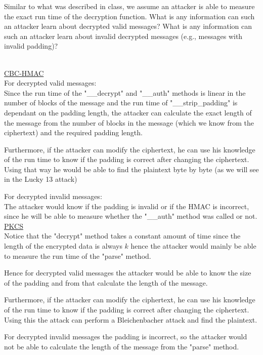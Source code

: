 \documentclass{article}
\title{
    \textmd{\bd{\hmwkClass:\ \\ \hmwkTitle}}\\
}
\author{\hmwkAuthorName}
\begin{document}
\maketitle

 \\
Similar to what was described in class, we assume an attacker is able to
measure the exact run time of the decryption function.
What is any information can  such an attacker learn about decrypted valid messages?
What is any information can such an attacker learn about invalid decrypted messages (e.g.,
messages with invalid padding)? \\ \\


\underline{CBC-HMAC} \\
For decrypted valid messages: \\
Since the run time of the "\_\_decrypt" and "\_\_auth" methods is linear
in the number of blocks of the message and the run time of "\_\_strip\_padding"
is dependant on the padding length, the attacker can calculate the exact length
of the message from the number of blocks in the message (which we know from the ciphertext)
and the required padding length.

Furthermore, if the attacker can modify the ciphertext, he can use his knowledge of the run time
to know if the padding is correct after changing the ciphertext. Using that way he would be able to find
the plaintext byte by byte (as we will see in the Lucky 13 attack)

For decrypted invalid messages: \\
The attacker would know if the padding is invalid or if the HMAC is incorrect,
since he will be able to measure whether the "\_\_auth" method was called or not. \\


\underline{PKCS} \\
Notice that the "decrypt" method takes a constant amount of time since the length of the encrypted data is always $k$
hence the attacker would mainly be able to measure the run time of the "parse" method.

Hence for decrypted valid messages the attacker would be able to know the size of the padding and from
that calculate the length of the message.

Furthermore, if the attacker can modify the ciphertext, he can use his knowledge of the run time
to know if the padding is correct after changing the ciphertext. Using this the attack can perform
a Bleichenbacher attack and find the plaintext.

For decrypted invalid messages the padding is incorrect, so the attacker would not be able to calculate
the length of the message from the "parse" method.
\end{document}
